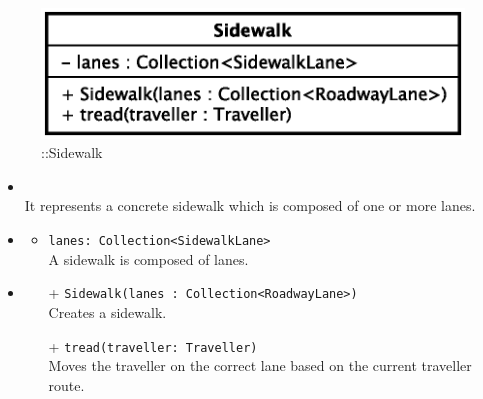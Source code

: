 \begin{figure}[h]
\centering
\includegraphics[scale=0.6,keepaspectratio]{images/solution/app/backend/sidewalk.eps}
\caption{\pReactiveComponent::Sidewalk}
\label{fig:sd-app-sidewalk}
\end{figure}
\FloatBarrier
\begin{itemize}
  \item \textbf{\descr} \\
    It represents a concrete sidewalk which is composed of one or more lanes.
  \item \textbf{\attrs}
  \begin{itemize}
    \item \texttt{lanes: Collection<SidewalkLane>} \\
A sidewalk is composed of lanes.
  \end{itemize}
  \item \textbf{\ops}
  \begin{itemize}
  \item[+] \texttt{Sidewalk(lanes : Collection<RoadwayLane>)} \\
    Creates a sidewalk.
    \item[+] \texttt{tread(traveller: Traveller)} \\
Moves the traveller on the correct lane based on the current traveller route. 
  \end{itemize}
\end{itemize}
